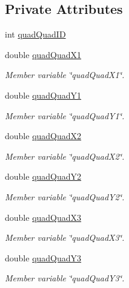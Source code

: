 \subsection*{Private Attributes}
\begin{DoxyCompactItemize}
\item 
int \mbox{\hyperlink{classQuad_a188ee923776070ca5e70fdf7b4e450e7}{quad\+Quad\+ID}}
\item 
double \mbox{\hyperlink{classQuad_a5253015c13e6858a9fd0d8c1823fb434}{quad\+Quad\+X1}}
\begin{DoxyCompactList}\small\item\em Member variable \char`\"{}quad\+Quad\+X1\char`\"{}. \end{DoxyCompactList}\item 
double \mbox{\hyperlink{classQuad_aa15251ffcca05eb0e35a3d6b60782c9d}{quad\+Quad\+Y1}}
\begin{DoxyCompactList}\small\item\em Member variable \char`\"{}quad\+Quad\+Y1\char`\"{}. \end{DoxyCompactList}\item 
double \mbox{\hyperlink{classQuad_a26bd14e8ee6c121eea8508480cc69139}{quad\+Quad\+X2}}
\begin{DoxyCompactList}\small\item\em Member variable \char`\"{}quad\+Quad\+X2\char`\"{}. \end{DoxyCompactList}\item 
double \mbox{\hyperlink{classQuad_afa2e09e70744ac127feedd54d2c2de85}{quad\+Quad\+Y2}}
\begin{DoxyCompactList}\small\item\em Member variable \char`\"{}quad\+Quad\+Y2\char`\"{}. \end{DoxyCompactList}\item 
double \mbox{\hyperlink{classQuad_af9b30ca5cb770b3afe12d93eae9bbff1}{quad\+Quad\+X3}}
\begin{DoxyCompactList}\small\item\em Member variable \char`\"{}quad\+Quad\+X3\char`\"{}. \end{DoxyCompactList}\item 
double \mbox{\hyperlink{classQuad_a71c344b5032f910a34a8ffef7ba894c0}{quad\+Quad\+Y3}}
\begin{DoxyCompactList}\small\item\em Member variable \char`\"{}quad\+Quad\+Y3\char`\"{}. \end{DoxyCompactList}\item 

\end{DoxyCompactItemize}
